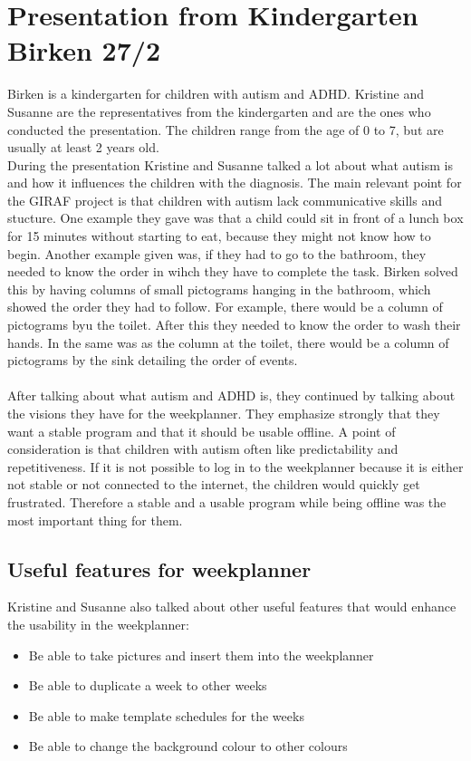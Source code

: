 \section{Presentation from Kindergarten Birken 27/2}
Birken is a kindergarten for children with autism and ADHD.
Kristine and Susanne are the representatives from the kindergarten and are the ones who conducted the presentation.
The children range from the age of 0 to 7, but are usually at least 2 years old.
\\
During the presentation Kristine and Susanne talked a lot about what autism is and how it influences the children with the diagnosis.
The main relevant point for the GIRAF project is that children with autism lack communicative skills and stucture. 
One example they gave was that a child could sit in front of a lunch box for 15 minutes without starting to eat, because they might not know how to begin.
Another example given was, if they had to go to the bathroom, they needed to know the order in wihch they have to complete the task.
Birken solved this by having columns of small pictograms hanging in the bathroom, which showed the order they had to follow. 
For example, there would be a column of pictograms byu the toilet.
After this they needed to know the order to wash their hands.
In the same was as the column at the toilet, there would be a column of pictograms by the sink detailing the order of events.
\\\\
After talking about what autism and ADHD is, they continued by talking about the visions they have for the weekplanner.
They emphasize strongly that they want a stable program and that it should be usable offline.
A point of consideration is that children with autism often like predictability and repetitiveness. 
If it is not possible to log in to the weekplanner because it is either not stable or not connected to the internet, the children would quickly get frustrated.
Therefore a stable and a usable program while being offline was the most important thing for them.

\subsection{Useful features for weekplanner}
Kristine and Susanne also talked about other useful features that would enhance the usability in the weekplanner:

\begin{itemize}
    \item Be able to take pictures and insert them into the weekplanner
    \item Be able to duplicate a week to other weeks
    \item Be able to make template schedules for the weeks
    \item Be able to change the background colour to other colours
\end{itemize}


